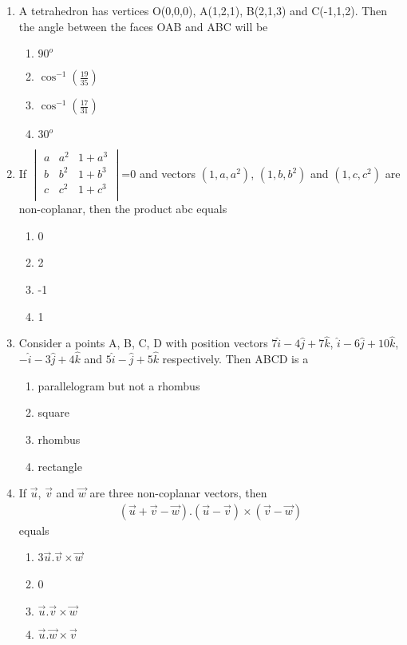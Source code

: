 \begin{enumerate}[label=\arabic*.,ref=\thesubsection.\theenumi]
\item A tetrahedron has vertices O(0,0,0), A(1,2,1), B(2,1,3) and C(-1,1,2). Then the angle between the faces OAB and ABC will be
\begin{enumerate}
\item $90^{o}$
\item $\cos^{-1}(\frac{19}{35})$
\item $\cos^{-1}(\frac{17}{31})$
\item $30^{o}$
\end{enumerate}

\item If 
$\begin{vmatrix}
a & a^{2} & 1 + a^{3} \\
b & b^{2} & 1 + b^{3} \\
c & c^{2} & 1 + c^{3} \\
\end{vmatrix}$=0
 and vectors $(1, a, a^{2})$, $(1, b, b^{2})$  and  $(1, c, c^{2})$ are non-coplanar, then the product abc equals
\begin{enumerate}
\item 0
\item 2
\item -1
\item 1
\end{enumerate}

\item Consider a points A, B, C, D with position vectors $7\hat{i}-4\hat{j}+7\hat{k}$, $\hat{i}-6\hat{j}+10\hat{k}$, $-\hat{i}-3\hat{j}+4\hat{k}$ and $5\hat{i}-\hat{j}+5\hat{k}$ respectively. Then ABCD is a 
\begin{enumerate}
\item parallelogram but not a rhombus
\item square
\item rhombus
\item rectangle
\end{enumerate}

\item If $\overrightarrow{u}$, $\overrightarrow{v}$ and $\overrightarrow{w}$ are three non-coplanar vectors, then 
\begin{align*}
(\overrightarrow{u} + \overrightarrow{v} - \overrightarrow{w}).(\overrightarrow{u}-\overrightarrow{v}) \times (\overrightarrow{v}-\overrightarrow{w})
\end{align*}
equals
\begin{enumerate}
\item 3$\overrightarrow{u}.\overrightarrow{v} \times \overrightarrow{w}$
\item 0
\item $\overrightarrow{u}.\overrightarrow{v} \times \overrightarrow{w}$
\item $\overrightarrow{u}.\overrightarrow{w} \times \overrightarrow{v}$
\end{enumerate}


\end{enumerate}
